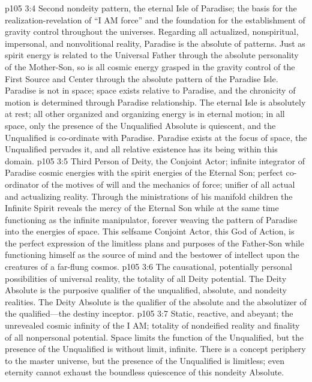 \vs p105 3:4 \bibnobreakspace {} Second nondeity pattern, the eternal Isle of Paradise; the basis for the realization\hyp{}revelation of “I AM force” and the foundation for the establishment of gravity control throughout the universes. Regarding all actualized, nonspiritual, impersonal, and nonvolitional reality, Paradise is the absolute of patterns. Just as spirit energy is related to the Universal Father through the absolute personality of the Mother\hyp{}Son, so is all cosmic energy grasped in the gravity control of the First Source and Center through the absolute pattern of the Paradise Isle. Paradise is not in space; space exists relative to Paradise, and the chronicity of motion is determined through Paradise relationship. The eternal Isle is absolutely at rest; all other organized and organizing energy is in eternal motion; in all space, only the presence of the Unqualified Absolute is quiescent, and the Unqualified is co\hyp{}ordinate with Paradise. Paradise exists at the focus of space, the Unqualified pervades it, and all relative existence has its being within this domain.
\pc \vs p105 3:5 \bibnobreakspace {} Third Person of Deity, the Conjoint Actor; infinite integrator of Paradise cosmic energies with the spirit energies of the Eternal Son; perfect co\hyp{}ordinator of the motives of will and the mechanics of force; unifier of all actual and actualizing reality. Through the ministrations of his manifold children the Infinite Spirit reveals the mercy of the Eternal Son while at the same time functioning as the infinite manipulator, forever weaving the pattern of Paradise into the energies of space. This selfsame Conjoint Actor, this God of Action, is the perfect expression of the limitless plans and purposes of the Father\hyp{}Son while functioning himself as the source of mind and the bestower of intellect upon the creatures of a far\hyp{}flung cosmos.
\pc \vs p105 3:6 \bibnobreakspace {} The causational, potentially personal possibilities of universal reality, the totality of all Deity potential. The Deity Absolute is the purposive qualifier of the unqualified, absolute, and nondeity realities. The Deity Absolute is the qualifier of the absolute and the absolutizer of the qualified---the destiny inceptor.
\pc \vs p105 3:7 \bibnobreakspace {} Static, reactive, and abeyant; the unrevealed cosmic infinity of the I AM; totality of nondeified reality and finality of all nonpersonal potential. Space limits the function of the Unqualified, but the presence of the Unqualified is without limit, infinite. There is a concept periphery to the master universe, but the presence of the Unqualified is limitless; even eternity cannot exhaust the boundless quiescence of this nondeity Absolute.

